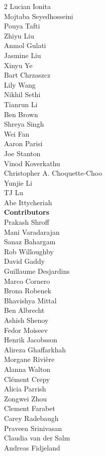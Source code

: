 \begin{multicols}{2}
Lucian Ionita\\
Mojtaba Seyedhosseini \\
Pouya Tafti \\
Zhiyu Liu \\
Anmol Gulati \\
Jasmine Liu \\
Xinyu Ye \\
Bart Chrzaszcz \\
Lily Wang \\
Nikhil Sethi \\
Tianrun Li \\
Ben Brown \\
Shreya Singh \\
Wei Fan \\
Aaron Parisi \\
Joe Stanton \\
Vinod Koverkathu \\
Christopher A. Choquette-Choo \\
Yunjie Li \\
TJ Lu \\
Abe Ittycheriah \\
\textbf{Contributors} \\
Prakash Shroff \\
Mani Varadarajan \\
Sanaz Bahargam \\
Rob Willoughby \\
David Gaddy \\
Guillaume Desjardins \\
Marco Cornero \\
Brona Robenek \\
Bhavishya Mittal \\
Ben Albrecht \\
Ashish Shenoy \\
Fedor Moiseev \\
Henrik Jacobsson \\
Alireza Ghaffarkhah \\
Morgane Rivière \\
Alanna Walton \\
Clément Crepy \\
Alicia Parrish \\
Zongwei Zhou \\
Clement Farabet \\
Carey Radebaugh \\
Praveen Srinivasan \\
Claudia van der Salm \\
Andreas Fidjeland \\

\end{multicols}
